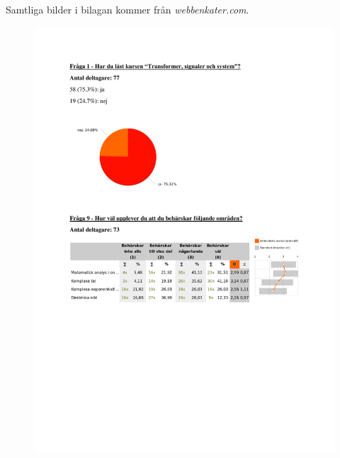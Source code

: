 \documentclass[12pt,a4paper,twoside,openright]{article}
\begin{document}
Samtliga bilder i bilagan kommer från
\textit{webbenkater.com}.
\begin{figure}
  \centerline{\includegraphics[page=1]{Bilagor/Bilaga1.pdf}}
\end{figure}
\end{document}
